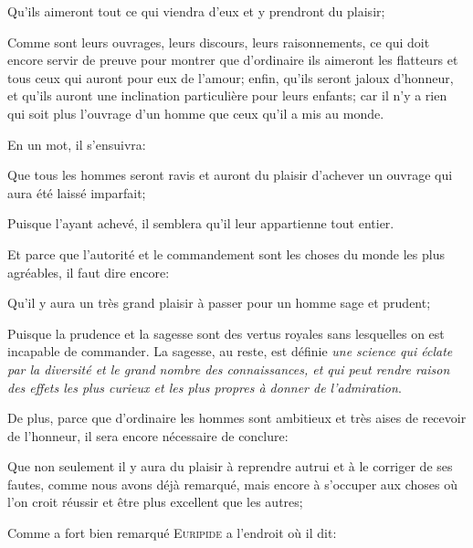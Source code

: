 \begin{lieu}
	Qu'ils aimeront tout ce qui viendra d'eux et y prendront du plaisir;
\end{lieu}

Comme sont leurs ouvrages, leurs discours, leurs raisonnements, ce qui doit encore servir de preuve pour montrer
que d'ordinaire ils aimeront les flatteurs et tous ceux qui auront pour eux de l'amour; enfin, qu'ils seront
jaloux d'honneur, et qu'ils auront une inclination particulière pour leurs enfants; car il n'y a rien qui soit
plus l'ouvrage d'un homme que ceux qu'il a mis au monde.

\bigbreak

En un mot, il s'ensuivra:

\begin{lieu}
	Que tous les hommes seront ravis et auront du plaisir d'achever un ouvrage qui aura été laissé imparfait;
\end{lieu}

Puisque l'ayant achevé, il semblera qu'il leur appartienne tout entier.

\bigbreak

Et parce que l'autorité et le commandement sont les choses du monde les plus agréables, il faut dire encore:

\begin{lieu}
	Qu'il y aura un très grand plaisir à passer pour un homme sage et prudent;
\end{lieu}

Puisque la prudence et la sagesse sont des vertus royales sans lesquelles on est incapable de commander.
La sagesse, au reste, est définie \emph{une science qui éclate par la diversité et le grand nombre des
connaissances, et qui peut rendre raison des effets les plus curieux et les plus propres à donner de
l'admiration}. 

\bigbreak

De plus, parce que d'ordinaire les hommes sont ambitieux et très aises de recevoir de l'honneur, il sera
encore nécessaire de conclure:

\begin{lieu}
	Que non seulement il y aura du plaisir à reprendre autrui et à le corriger de ses fautes, comme nous
	avons déjà remarqué, mais encore à s'occuper aux choses où l'on croit réussir et être plus excellent
	que les autres;
\end{lieu}

Comme a fort bien remarqué \textsc{Euripide} a l'endroit où il dit:

